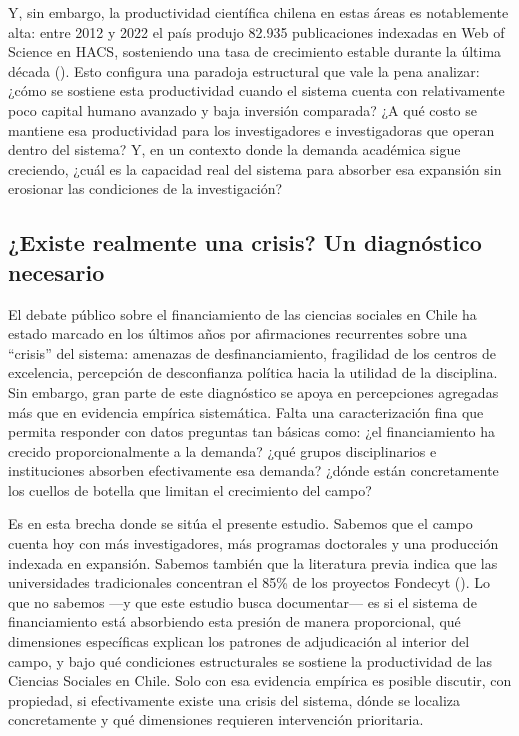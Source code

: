 \documentclass[
  12pt,
  letterpaper,
]{article}
\begin{document}
Y, sin embargo, la productividad científica chilena en estas áreas es
notablemente alta: entre 2012 y 2022 el país produjo 82.935
publicaciones indexadas en Web of Science en HACS, sosteniendo una tasa
de crecimiento estable durante la última década
(). Esto
configura una paradoja estructural que vale la pena analizar: ¿cómo se
sostiene esta productividad cuando el sistema cuenta con relativamente
poco capital humano avanzado y baja inversión comparada? ¿A qué costo se
mantiene esa productividad para los investigadores e investigadoras que
operan dentro del sistema? Y, en un contexto donde la demanda académica
sigue creciendo, ¿cuál es la capacidad real del sistema para absorber
esa expansión sin erosionar las condiciones de la investigación?

\subsection{¿Existe realmente una crisis? Un diagnóstico
necesario}\label{existe-realmente-una-crisis-un-diagnuxf3stico-necesario}

El debate público sobre el financiamiento de las ciencias sociales en
Chile ha estado marcado en los últimos años por afirmaciones recurrentes
sobre una ``crisis'' del sistema: amenazas de desfinanciamiento,
fragilidad de los centros de excelencia, percepción de desconfianza
política hacia la utilidad de la disciplina. Sin embargo, gran parte de
este diagnóstico se apoya en percepciones agregadas más que en evidencia
empírica sistemática. Falta una caracterización fina que permita
responder con datos preguntas tan básicas como: ¿el financiamiento ha
crecido proporcionalmente a la demanda? ¿qué grupos disciplinarios e
instituciones absorben efectivamente esa demanda? ¿dónde están
concretamente los cuellos de botella que limitan el crecimiento del
campo?

Es en esta brecha donde se sitúa el presente estudio. Sabemos que el
campo cuenta hoy con más investigadores, más programas doctorales y una
producción indexada en expansión. Sabemos también que la literatura
previa indica que las universidades tradicionales concentran el 85\% de
los proyectos Fondecyt
(). Lo
que no sabemos ---y que este estudio busca documentar--- es si el
sistema de financiamiento está absorbiendo esta presión de manera
proporcional, qué dimensiones específicas explican los patrones de
adjudicación al interior del campo, y bajo qué condiciones estructurales
se sostiene la productividad de las Ciencias Sociales en Chile. Solo con
esa evidencia empírica es posible discutir, con propiedad, si
efectivamente existe una crisis del sistema, dónde se localiza
concretamente y qué dimensiones requieren intervención prioritaria.
\end{document}
